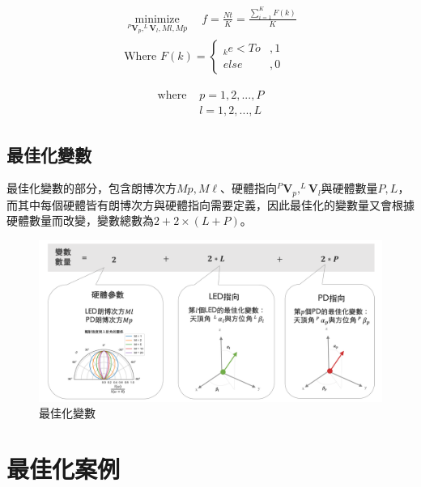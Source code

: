     \begin{equation}
        \label{eqn:objective}
        \begin{aligned}
        \underset{^{P}\boldsymbol{V}_p, ^{L}\boldsymbol{V}_l,Ml,Mp}{\operatorname{minimize}} 
        \quad f = \frac{Nt}{K}=
        \frac{\sum_{i=1}^{K}F(k)}{K}  \\
        \text{Where }F(k)=
        \begin{cases}
            _{k}e<To&,1\\
            else&,0
        \end{cases}
        \end{aligned}
    \end{equation}

    \begin{align*} \text{where }
        &p=1,2,...,P\\&l=1,2,...,L
    \end{align*}


    \subsection{最佳化變數}
    \label{chp:optimize_variable}

    最佳化變數的部分，包含朗博次方$Mp,M\ell$、硬體指向$^{P}\boldsymbol{V}_p,^{L}\boldsymbol{V}_l$與硬體數量$P,L$，而其中每個硬體皆有朗博次方與硬體指向需要定義，因此最佳化的變數量又會根據硬體數量而改變，變數總數為$2+2\times(L+P)$。


    \begin{figure}[htpb]
        \centering
        \includegraphics[width=15cm]{ch5pic/optimize_variable.png}
        \caption{最佳化變數}
        \label{pic:optimize_variable}
    \end{figure}



\section{最佳化案例}
\label{chp:optimize_case}

